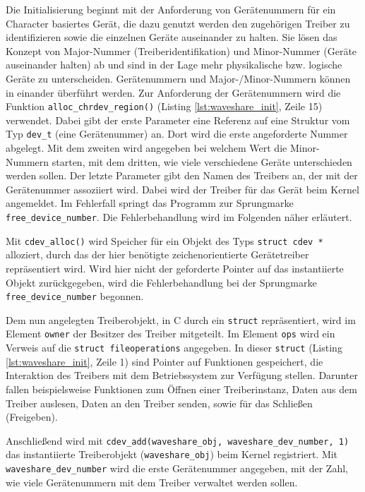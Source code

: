 Die Initialisierung beginnt mit der Anforderung von Gerätenummern für ein Character basiertes Gerät, die dazu genutzt werden den zugehörigen Treiber zu identifizieren sowie die einzelnen Geräte auseinander zu halten. Sie lösen das Konzept von Major-Nummer (Treiberidentifikation) und Minor-Nummer (Geräte auseinander halten) ab und sind in der Lage mehr physikalische bzw. logische Geräte zu unterscheiden. Gerätenummern und Major-/Minor-Nummern können in einander überführt werden. Zur Anforderung der Gerätenummern wird die Funktion \texttt{alloc_chrdev_region()} (Listing \ref{lst:waveshare_init}, Zeile 15) verwendet. Dabei gibt der erste Parameter eine Referenz auf eine Struktur vom Typ \texttt{dev\_t} (eine Gerätenummer) an. Dort wird die erste angeforderte Nummer abgelegt. Mit dem zweiten wird angegeben bei welchem Wert die Minor-Nummern starten, mit dem dritten, wie viele verschiedene Geräte unterschieden werden sollen. Der letzte Parameter gibt den Namen des Treibers an, der mit der Gerätenummer assoziiert wird. Dabei wird der Treiber für das Gerät beim Kernel angemeldet. Im Fehlerfall springt das Programm zur Sprungmarke \texttt{free_device_number}. Die Fehlerbehandlung wird im Folgenden näher erläutert.

Mit \texttt{cdev_alloc()} wird Speicher für ein Objekt des Typs \texttt{struct cdev *} alloziert, durch das der hier benötigte zeichenorientierte Gerätetreiber repräsentiert wird. Wird hier nicht der geforderte Pointer auf das instantiierte Objekt zurückgegeben, wird die Fehlerbehandlung bei der Sprungmarke \texttt{free_device_number} begonnen. 

Dem nun angelegten Treiberobjekt, in C durch ein \texttt{struct} repräsentiert, wird im Element \texttt{owner} der Besitzer des Treiber mitgeteilt. Im Element \texttt{ops} wird ein Verweis auf die \texttt{struct fileoperations} angegeben. In dieser \texttt{struct} (Listing \ref{lst:waveshare_init}, Zeile 1) sind Pointer auf Funktionen gespeichert, die Interaktion des Treibers mit dem Betriebssystem zur Verfügung stellen. Darunter fallen beispielsweise Funktionen zum Öffnen einer Treiberinstanz, Daten aus dem Treiber auslesen, Daten an den Treiber senden, sowie für das Schließen (Freigeben).  

Anschließend wird mit \texttt{cdev_add(waveshare_obj, waveshare_dev_number, 1)} das instantiierte Treiberobjekt (\texttt{waveshare\_obj}) beim Kernel registriert. Mit \\
\texttt{waveshare\_dev\_number} wird die erste Gerätenummer angegeben, mit der Zahl, wie viele Gerätenummern mit dem Treiber verwaltet werden sollen. 

